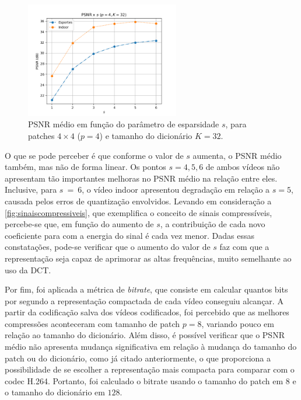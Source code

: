 \documentclass[cic,tc]{iiufrgs}
\begin{document}
\begin{figure}[H]
    \caption{PSNR médio em função do parâmetro de esparsidade $s$, para patches $4\times4$ ($p=4$) e 
    tamanho do dicionário $K=32$.}
    \begin{center}
        \includegraphics[width=0.6\textwidth]{img/graficos/p4d32_sv_psnr.png}
    \end{center}
    \label{fig:psnrsvar}
\end{figure}

O que se pode perceber é que conforme o valor de $s$ aumenta, o PSNR médio também, 
mas não de forma linear.
Os pontos $s=4,5,6$ de ambos vídeos não apresentam tão importantes melhoras no 
PSNR médio na relação entre eles. 
Inclusive, para $s~=~6$, o vídeo indoor apresentou degradação em relação a $s=5$, 
causada pelos erros de quantização envolvidos.
Levando em consideração a \autoref{fig:sinaiscompressiveis}, que exemplifica o conceito de
sinais compressíveis, percebe-se que, 
em função do aumento de $s$, a contribuição de cada novo coeficiente para com 
a energia do sinal é cada vez menor.
Dadas essas constatações, pode-se verificar que o aumento do valor de $s$ faz com 
que a representação seja capaz de aprimorar as altas frequências, muito semelhante 
ao uso da DCT.

Por fim, foi aplicada a métrica de \emph{bitrate},
que consiste em calcular quantos bits por segundo a representação compactada 
de cada vídeo conseguiu alcançar.
A partir da codificação salva dos vídeos codificados,
foi percebido que as melhores compressões aconteceram com tamanho de patch $p=8$, 
variando pouco em relação ao tamanho do dicionário.
Além disso, é possível verificar que o PSNR médio não apresenta mudança significativa em relação 
à mudança do tamanho do patch ou do dicionário, como já citado anteriormente,
o que proporciona a possibilidade de se escolher a representação mais compacta para 
comparar com o codec H.264.
Portanto, foi calculado o bitrate usando o tamanho do patch em $8$ e o tamanho do dicionário
em $128$.
\end{document}
